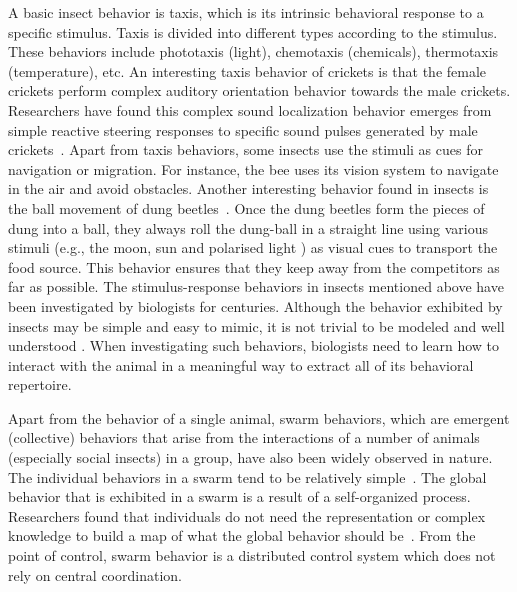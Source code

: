 A basic insect behavior is taxis, which is its intrinsic behavioral response to a specific stimulus. Taxis is divided into different types according to the stimulus. These behaviors include phototaxis (light), chemotaxis (chemicals), thermotaxis (temperature), etc. An interesting taxis behavior of crickets is that the female crickets perform complex auditory orientation behavior towards the male crickets. Researchers have found this complex sound localization behavior emerges from simple reactive steering responses to specific sound pulses generated by male crickets~\cite{Hedwig2004}. Apart from taxis behaviors, some insects use the stimuli as cues for navigation or migration. For instance, the bee uses its vision system to navigate in the air and avoid obstacles. Another interesting behavior found in insects is the ball movement of dung beetles~\cite{Emily_2012}. Once the dung beetles form the pieces of dung into a ball, they always roll the dung-ball in a straight line using various stimuli (e.g., the moon, sun and polarised light \cite{Byrne_2003, Matthews_1962}) as visual cues to transport the food source. This behavior ensures that they keep away from the competitors as far as possible. The stimulus-response behaviors in insects mentioned above have been investigated by biologists for centuries. Although the behavior exhibited by insects may be simple and easy to mimic, it is not trivial to be modeled and well understood \cite{Ignacio2009}. When investigating such behaviors, biologists need to learn how to interact with the animal in a meaningful way to extract all of its behavioral repertoire. 

Apart from the behavior of a single animal, swarm behaviors, which are emergent (collective) behaviors that arise from the interactions of a number of animals (especially social insects) in a group, have also been widely observed in nature. The individual behaviors in a swarm tend to be relatively simple~\cite{Camazine2001}. The global behavior that is exhibited in a swarm is a result of a self-organized process. Researchers found that individuals do not need the representation or complex knowledge to build a map of what the global behavior should be~\cite{Garnier:SI:2007}. From the point of control, swarm behavior is a distributed control system which does not rely on central coordination.

